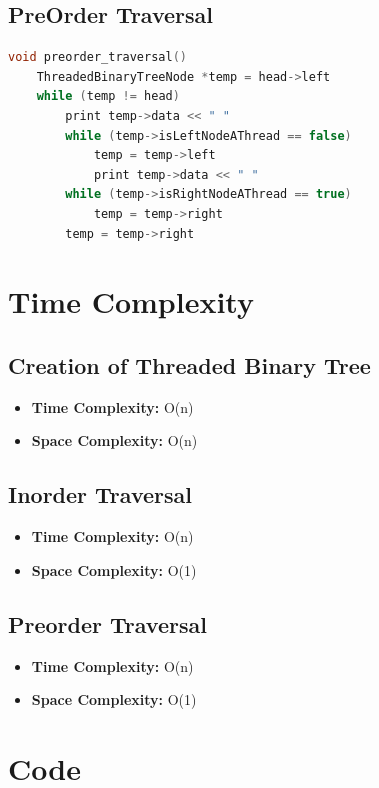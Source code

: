 \documentclass[11pt]{article}
\begin{document}
\subsection{PreOrder Traversal}
\begin{lstlisting}[language=C++]
void preorder_traversal()
    ThreadedBinaryTreeNode *temp = head->left
    while (temp != head)
        print temp->data << " "
        while (temp->isLeftNodeAThread == false)
            temp = temp->left
            print temp->data << " "
        while (temp->isRightNodeAThread == true)
            temp = temp->right
        temp = temp->right

\end{lstlisting}

\section{Time Complexity}

\subsection{Creation of Threaded Binary Tree}
\begin{itemize}
    \item \textbf{Time Complexity:} O(n)
    \item \textbf{Space Complexity:} O(n)
\end{itemize}

\subsection{Inorder Traversal}

\begin{itemize}
    \item \textbf{Time Complexity:} O(n)
    \item \textbf{Space Complexity:} O(1)
\end{itemize}

\subsection{Preorder Traversal}

\begin{itemize}
    \item \textbf{Time Complexity:} O(n)
    \item \textbf{Space Complexity:} O(1)
\end{itemize}

\section{Code}
\end{document}
